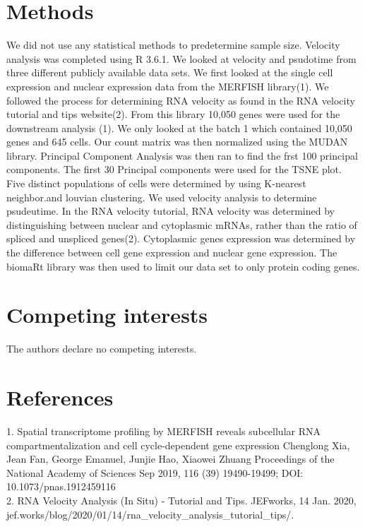 \documentclass[12pt]{article}
\begin{document}
\section*{Methods}
We did not use any statistical methods to predetermine sample size. Velocity analysis was completed using R 3.6.1. We looked at velocity and psudotime from three different publicly available data sets. We first looked at the single cell expression and nuclear expression data from the MERFISH library(1). We followed the process for determining RNA velocity as found in the RNA velocity tutorial and tips website(2). From this library 10,050 genes were used for the downstream analysis (1). We only looked at the batch 1 which contained 10,050 genes and 645 cells. Our count matrix was then normalized using the MUDAN library. Principal Component Analysis was then ran to find the frst 100 principal components. The first 30 Principal components were used for the TSNE plot. Five distinct populations of cells were determined by using K-nearest neighbor.and louvian clustering. We used velocity analysis to determine psudeutime. In the RNA velocity tutorial, RNA velocity was determined by distinguishing between nuclear and cytoplasmic mRNAs, rather than the ratio of spliced and unspliced genes(2). Cytoplasmic genes expression was determined by the difference between cell gene expression and nuclear gene expression. The biomaRt library was then used to limit our data set to only protein coding genes.        

\section*{Competing interests}
The authors declare no competing interests.






%
%

\section*{References}
1. Spatial transcriptome profiling by MERFISH reveals subcellular RNA compartmentalization and cell cycle-dependent gene expression
Chenglong Xia, Jean Fan, George Emanuel, Junjie Hao, Xiaowei Zhuang
Proceedings of the National Academy of Sciences Sep 2019, 116 (39) 19490-19499; DOI: 10.1073/pnas.1912459116 \\
2. RNA Velocity Analysis (In Situ) - Tutorial and Tips. JEFworks, 14 Jan. 2020, \\ jef.works/blog/2020/01/14/rna\_velocity\_analysis\_tutorial\_tips/.
\end{document}
